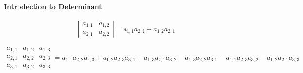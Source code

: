 \documentclass[UTF8]{ctexart}
\begin{document}
\paragraph{Introdection to Determinant}

$$
\left|\begin{array}{ll}
  a_{1,1} & a_{1,2} \\
  a_{2,1} & a_{2,2}
  \end{array}\right|=a_{1,1} a_{2,2}-a_{1,2} a_{2,1}
$$

$$
\begin{array}{|lll|l}
  a_{1,1} & a_{1,2} & a_{1,3} \\
  a_{2,1} & a_{2,2} & a_{2,3} \\
  a_{3,1} & a_{3,2} & a_{3,3}
  \end{array} 
  =a_{1,1} a_{2,2} a_{3,3}+a_{1,2} a_{2,3} a_{3,1}+a_{1,3} a_{2,1} a_{3,2}-a_{1,3} a_{2,2} a_{3,1}-a_{1,1} a_{2,3} a_{3,2}-a_{1,2} a_{2,1} a_{3,3}
$$
\end{document}
